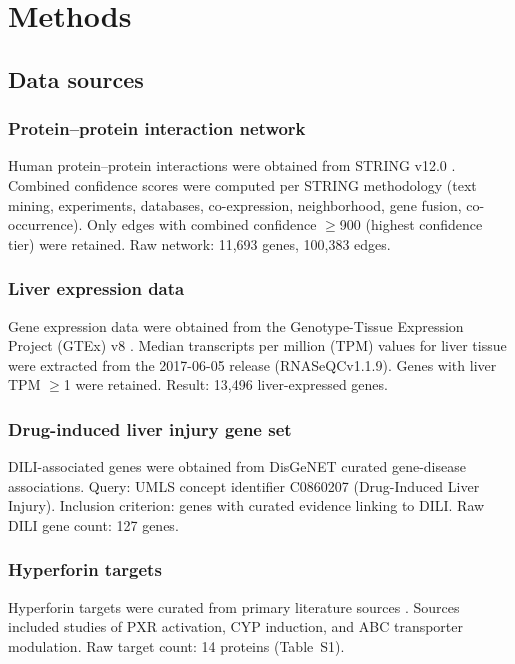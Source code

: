\section{Methods}

\subsection{Data sources}

\subsubsection{Protein--protein interaction network}
Human protein--protein interactions were obtained from STRING v12.0 \citep{Szklarczyk2023}.
Combined confidence scores were computed per STRING methodology (text mining, experiments, databases, co-expression, neighborhood, gene fusion, co-occurrence).
Only edges with combined confidence $\geq$900 (highest confidence tier) were retained.
Raw network: 11,693 genes, 100,383 edges.

\subsubsection{Liver expression data}
Gene expression data were obtained from the Genotype-Tissue Expression Project (GTEx) v8 \citep{GTEx2020}.
Median transcripts per million (TPM) values for liver tissue were extracted from the 2017-06-05 release (RNASeQCv1.1.9).
Genes with liver TPM $\geq$1 were retained.
Result: 13,496 liver-expressed genes.

\subsubsection{Drug-induced liver injury gene set}
DILI-associated genes were obtained from DisGeNET \citep{Pinero2020} curated gene-disease associations.
Query: UMLS concept identifier C0860207 (Drug-Induced Liver Injury).
Inclusion criterion: genes with curated evidence linking to DILI.
Raw DILI gene count: 127 genes.

\subsubsection{Hyperforin targets}
Hyperforin targets were curated from primary literature sources \citep{Moore2000, Watkins2001}.
Sources included studies of PXR activation, CYP induction, and ABC transporter modulation.
Raw target count: 14 proteins (Table~S1).

